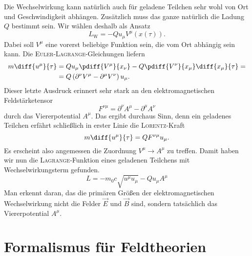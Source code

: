 Die Wechselwirkung kann natürlich auch für geladene Teilchen sehr wohl von Ort und Geschwindigkeit abhängen. Zusätzlich muss das ganze natürlich die Ladung $Q$ bestimmt sein. Wir wählen deshalb als Ansatz
\begin{equation*}
L_\text{W} = -Q u_\mu V^\mu\left(x(\tau)\right).
\end{equation*}
Dabei soll $V^\mu$ eine vorerst beliebige Funktion sein, die vom Ort abhängig sein kann. Die \textsc{Euler-Lagrange}-Gleichungen liefern 
\begin{align*}
m\diff{u^\mu}{\tau} &= Q u_\mu\pdiff{V^\mu}{x_\nu}-Q\pdiff{V^\nu}{x_\mu}\diff{x_\mu}{\tau} = \\
& = Q\left(\partial^\nu V^\mu - \partial^\mu V^\nu \right)u_\mu.
\end{align*}
Dieser letzte Ausdruck erinnert sehr stark an den elektromagnetischen Feldstärketensor
\begin{equation*}
F^{\nu\mu}=\partial^\nu A^\mu - \partial^\mu A^\nu
\end{equation*}
durch das Viererpotential $A^\mu$. Das ergibt durchaus Sinn, denn ein geladenes Teilchen erfährt schließlich in erster Linie die \textsc{Lorentz}-Kraft
\begin{equation*}
m\diff{u^\mu}{\tau} = QF^{\nu\mu}u_\mu.
\end{equation*}
Es erscheint also angemessen die Zuordnung $V^\mu\rightarrow A^\mu$ zu treffen. Damit haben wir nun die \textsc{Lagrange}-Funktion eines geladenen Teilchens mit Wechselwirkungsterm gefunden.
\begin{equation*}
L = -m_0c\sqrt{u^\mu u_\mu} - Qu_\mu A^\mu
\end{equation*}
Man erkennt daran, das die primären Größen der elektromagnetischen Wechselwirkung nicht die Felder $\vec{E}$ und $\vec{B}$ sind, sondern tatsächlich das Viererpotential $A^\mu$. 

\section{Formalismus für Feldtheorien}

